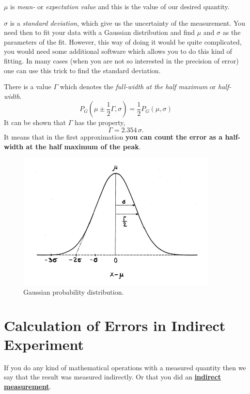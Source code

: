 \documentclass[12pt,a4paper]{article}
\newcommand{\definition}[1]{ \textcolor{MyRed}{\uline{\textbf {#1}}}}%
\begin{document}
$\mu$ is \textit{mean-} or \textit{expectation value} and this is the value of our desired quantity. 

$\sigma$ is a \textit{standard deviation}, which give us the uncertainty of the measurement.
You need then to fit your data with a Gaussian distribution and find $\mu$ and $\sigma$ as the parameters of the fit. However, this way of doing it would be quite complicated, you would need some additional software which allows you to do this kind of fitting. In many cases (when you are not so interested in the precision of error) one can use this trick to find the standard deviation.

There is a value $\Gamma$ which denotes the \textit{full-width at the half maximum} or \textit{half-width}.
\begin{equation}
P_G(\mu\pm\frac{1}{2}\Gamma,\sigma) = \frac{1}{2}P_G(\mu, \sigma)
\end{equation}
It can be shown that $\Gamma$ has the property,
\begin{equation}
\Gamma = 2.354\,\sigma.
\end{equation}
It means that in the first approximation \textbf{you can count the error as a half-width at the half maximum of the peak}.
\begin{figure}[H]
	\centering
	\vskip -0.5cm
	\includegraphics[width=.7\linewidth]{gauss_croped.pdf}
	\vskip -0.5cm
	\caption{Gaussian probability distribution.}
\end{figure}

\section{Calculation of Errors in Indirect Experiment }\label{indirect_meas}
If you do any kind of mathematical operations with a measured quantity then we say that the result was measured indirectly. Or that you did an \definition{indirect measurement}. 
\end{document}
